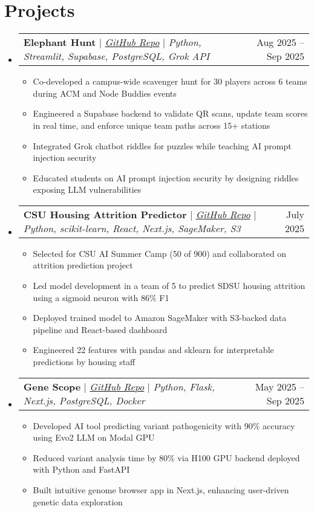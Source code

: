 \documentclass[letterpaper,11pt]{article}
\makeatletter
\newcommand{\resumeItem}[1]{
  \item\small{
    {#1 \vspace{-2pt}}
  }
}
\newcommand{\resumeProjectHeading}[2]{
    \item
    \begin{tabular*}{0.97\textwidth}{l@{\extracolsep{\fill}}r}
      \small#1 & #2 \\
    \end{tabular*}\vspace{-7pt}
}
\newcommand{\resumeSubHeadingListStart}{\begin{itemize}[leftmargin=0.15in, label={}]}
\newcommand{\resumeSubHeadingListEnd}{\end{itemize}}
\newcommand{\resumeItemListStart}{\begin{itemize}}
\newcommand{\resumeItemListEnd}{\end{itemize}\vspace{-5pt}}
\makeatother
\begin{document}
\section{Projects}
    \resumeSubHeadingListStart
    \resumeProjectHeading
          {\textbf{Elephant Hunt} $|$ \emph{\href{https://github.com/bebopkenny/Elephant-Hunt}{GitHub Repo}} $|$ \emph{Python, Streamlit, Supabase, PostgreSQL, Grok API}}{Aug 2025 -- Sep 2025}
          \resumeItemListStart
            \resumeItem{Co-developed a campus-wide scavenger hunt for 30 players across 6 teams during ACM and Node Buddies events}
            \resumeItem{Engineered a Supabase backend to validate QR scans, update team scores in real time, and enforce unique team paths across 15+ stations}
            \resumeItem{Integrated Grok chatbot riddles for puzzles while teaching AI prompt injection security}
            \resumeItem{Educated students on AI prompt injection security by designing riddles exposing LLM vulnerabilities}
          \resumeItemListEnd
          \resumeProjectHeading
          {\textbf{CSU Housing Attrition Predictor} $|$ \emph{\href{https://github.com/0x10jalencas/csu-summer-ai-camp-2025/tree/main}{GitHub Repo}} $|$ \emph{Python, scikit-learn, React, Next.js, SageMaker, S3}}{July 2025}
          \resumeItemListStart
            \resumeItem{Selected for CSU AI Summer Camp (50 of 900) and collaborated on attrition prediction project}
            \resumeItem{Led model development in a team of 5 to predict SDSU housing attrition using a sigmoid neuron with {86\%} F1}
            \resumeItem{Deployed trained model to Amazon SageMaker with S3-backed data pipeline and React-based dashboard}
            \resumeItem{Engineered 22 features with pandas and sklearn for interpretable predictions by housing staff}
          \resumeItemListEnd
      \resumeProjectHeading
          {\textbf{Gene Scope} $|$ \emph{\href{http://www.github.com/bebopkenny/Gene-Scope}{GitHub Repo}} $|$ \emph{Python, Flask, Next.js, PostgreSQL, Docker}}{May 2025 -- Sep 2025}
          \resumeItemListStart
            \resumeItem{Developed AI tool predicting variant pathogenicity with {90\%} accuracy using Evo2 LLM on Modal GPU}
            \resumeItem{Reduced variant analysis time by {80\%} via H100 GPU backend deployed with Python and FastAPI}
            \resumeItem{Built intuitive genome browser app in Next.js, enhancing user-driven genetic data exploration}
          \resumeItemListEnd
    \resumeSubHeadingListEnd
\end{document}
